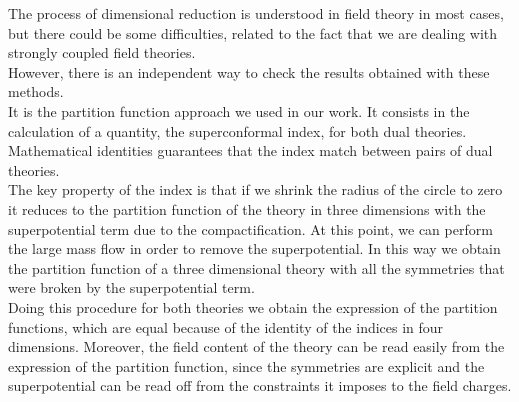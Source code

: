 The process of dimensional reduction is understood in field theory in most cases, but there could be some difficulties, related to the fact that we are dealing with strongly coupled field theories.\\
However, there is an independent way to check the results obtained with these methods.\\
It is the partition function approach we used in our work.
It consists in the calculation of a quantity, the superconformal index, for both dual theories. 
Mathematical identities guarantees that the index match between pairs of dual theories.\\
The key property of the index is that if we shrink the radius of the circle to zero it reduces to the partition function of the theory in three dimensions with the superpotential term due to the compactification.
At this point, we can perform the large mass flow in order to remove the superpotential. 
In this way we obtain the partition function of a three dimensional theory with all the symmetries that were broken by the superpotential term.\\
Doing this procedure for both theories we obtain the expression of the partition functions, which are equal because of the identity of the indices in four dimensions.
Moreover, the field content of the theory can be read easily from the expression of the partition function, since the symmetries are explicit and the superpotential can be read off from the constraints it imposes to the field charges.\\  

